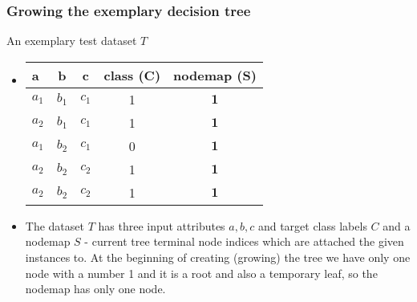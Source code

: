 \documentclass[smaller, proffesionalfonts]{beamer}
\def\bm{\boldsymbol}
\begin{document}
\begin{frame}
\frametitle{Growing the exemplary decision tree}
\begin{block}{An exemplary test dataset $T$}
\begin{itemize}
\item
\begin{center}
{\sf
   \begin{tabular}{|p{3mm}||c|c||c||c|}
   \hline 
   a & b & c & class (C) & nodemap (S)\\
   \hline
   \hline
    $a_1$ & $b_1$ & $c_1$ & 1 & $\bm 1$ \\
   \hline
    $a_2$ & $b_1$ & $c_1$ & 1 & $\bm 1$ \\
   \hline
    $a_1$ & $b_2$ & $c_1$ & 0 & $\bm 1$ \\
   \hline
    $a_2$ & $b_2$ & $c_2$ & 1 & $\bm 1$ \\
   \hline
    $a_2$ & $b_2$ & $c_2$ & 1 & $\bm 1$ \\
   \hline
   \end{tabular}
}
\end{center}
\item
\justifying
The dataset $T$ has three input attributes $a,b,c$ and target class labels $C$ and a nodemap $S$ - current tree terminal node indices which are attached the given instances to.
At the beginning of creating (growing) the tree we have only one node with a number 1 and it is a root and also a temporary leaf, so the nodemap has only one node.

\begin{center}
\end{center}

\end{itemize}
\end{block}
\end{frame}
\end{document}
